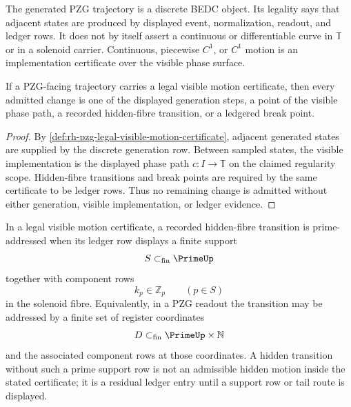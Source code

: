 \begin{principle}
\label{prin:rh-pzg-discrete-legality-not-differentiability}
The generated PZG trajectory is a discrete BEDC object.  Its legality says
that adjacent states are produced by displayed event, normalization, readout,
and ledger rows.  It does not by itself assert a continuous or differentiable
curve in $\mathbb T$ or in a solenoid carrier.  Continuous, piecewise
$C^1$, or $C^1$ motion is an implementation certificate over the visible
phase surface.
\end{principle}

\begin{theorem}
\label{thm:rh-pzg-visible-motion-no-unledgered-jump}
If a PZG-facing trajectory carries a legal visible motion certificate, then
every admitted change is one of the displayed generation steps, a point of
the visible phase path, a recorded hidden-fibre transition, or a ledgered
break point.
\end{theorem}

\begin{proof}
By \autoref{def:rh-pzg-legal-visible-motion-certificate}, adjacent generated
states are supplied by the discrete generation row.  Between sampled states,
the visible implementation is the displayed phase path $c:I\to\mathbb T$ on
the claimed regularity scope.  Hidden-fibre transitions and break points are
required by the same certificate to be ledger rows.  Thus no remaining change
is admitted without either generation, visible implementation, or ledger
evidence.
\end{proof}

\begin{definition}
\label{def:rh-pzg-prime-addressed-hidden-transition}
In a legal visible motion certificate, a recorded hidden-fibre transition is
prime-addressed when its ledger row displays a finite support
$$
S\subset_{\mathrm{fin}}\PrimeUp
$$
together with component rows
$$
k_p\in\mathbb Z_p
\qquad(p\in S)
$$
in the solenoid fibre.  Equivalently, in a PZG readout the transition may be
addressed by a finite set of register coordinates
$$
D\subset_{\mathrm{fin}}\PrimeUp\times\mathbb N
$$
and the associated component rows at those coordinates.  A hidden transition
without such a prime support row is not an admissible hidden motion inside
the stated certificate; it is a residual ledger entry until a support row or
tail route is displayed.
\end{definition}

